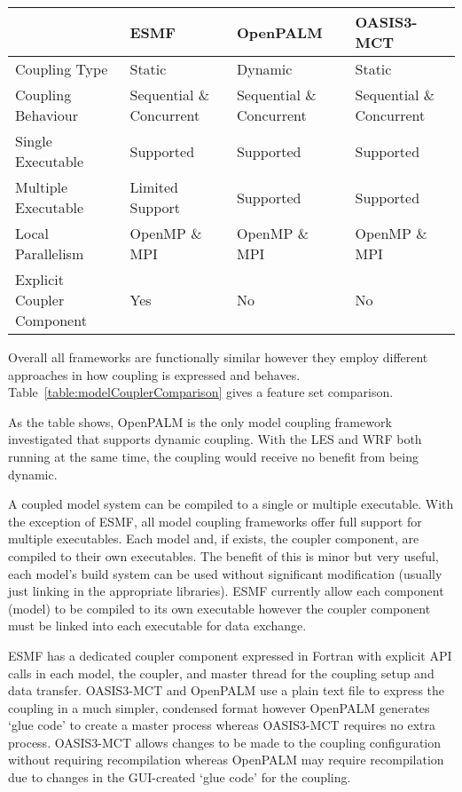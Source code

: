 \begin{figure*}
    \begin{tabular}{|l|l|l|l|}
        \hline
        & ESMF & OpenPALM & OASIS3-MCT\\
        \hline
        Coupling Type & Static & Dynamic & Static\\
        \hline
        Coupling Behaviour & Sequential \& Concurrent & Sequential \& Concurrent & Sequential \& Concurrent\\
        \hline
        Single Executable & Supported & Supported & Supported\\
        \hline
        Multiple Executable & Limited Support & Supported & Supported\\
        \hline
        Local Parallelism & OpenMP \& MPI & OpenMP \& MPI & OpenMP \& MPI\\
        \hline
        Explicit Coupler Component & Yes & No & No\\
        \hline
    \end{tabular}
    \caption{Comparison of model coupling frameworks}
    \label{table:modelCouplerComparison}
\end{figure*}

Overall all frameworks are functionally similar however they employ different
approaches in how coupling is expressed and behaves.
Table~\ref{table:modelCouplerComparison} gives a feature set comparison.

As the table shows, OpenPALM is the only model coupling framework investigated
that supports dynamic coupling. With the LES and WRF both running at the same
time, the coupling would receive no benefit from being dynamic.

A coupled model system can be compiled to a single or multiple executable. With
the exception of ESMF, all model coupling frameworks offer full support for
multiple executables. Each model and, if exists, the coupler component, are
compiled to their own executables. The benefit of this is minor but very useful,
each model's build system can be used without significant modification (usually
just linking in the appropriate libraries). ESMF currently allow each component
(model) to be compiled to its own executable however the coupler component must
be linked into each executable for data exchange.

ESMF has a dedicated coupler component expressed in Fortran with explicit API
calls in each model, the coupler, and master thread for the coupling setup and
data transfer. OASIS3-MCT and OpenPALM use a plain text file to express the
coupling in a much simpler, condensed format however OpenPALM generates `glue
code' to create a master process whereas OASIS3-MCT requires no extra process.
OASIS3-MCT allows changes to be made to the coupling configuration without
requiring recompilation whereas OpenPALM may require recompilation due to
changes in the GUI-created `glue code' for the coupling.

